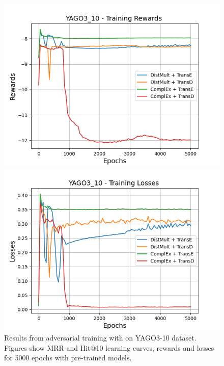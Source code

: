 \begin{figure}
    \begin{minipage}{.45\textwidth}
      \centering
      \includegraphics[width=0.9\linewidth]{figures/results/gan_train/pretrained/uncertainty/max/entropy/yago3_10/5k_epochs/uncertainty_yago3_10_rew.png}
    \end{minipage}%
     \begin{minipage}{.45\textwidth}
      \centering
      \includegraphics[width=0.9\linewidth]{figures/results/gan_train/pretrained/uncertainty/max/entropy/yago3_10/5k_epochs/uncertainty_yago3_10_losses.png}
    \end{minipage}%
    \caption{Results from adversarial training with \usmax on \textsc{YAGO3-10} dataset.
    Figures show MRR and Hit@10 learning curves, rewards and losses for 5000 epochs with pre-trained models.}
    \label{fig:gan_train_pretrained_usmax_yago3_10}
\end{figure}

